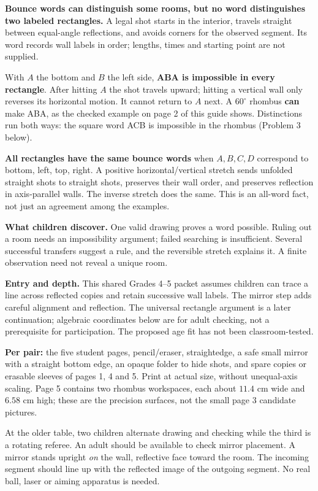 \documentclass[11pt,letterpaper]{article}
\newcommand{\sectiontitle}[1]{\par\vspace{4pt}{\large\bfseries #1}\par}
\begin{document}
\sectiontitle{The mathematics first}
\textbf{Bounce words can distinguish some rooms, but no word distinguishes two labeled rectangles.} A legal shot starts in the interior, travels straight between equal-angle reflections, and avoids corners for the observed segment. Its word records wall labels in order; lengths, times and starting point are not supplied.

With $A$ the bottom and $B$ the left side, \textbf{ABA is impossible in every rectangle}. After hitting $A$ the shot travels upward; hitting a vertical wall only reverses its horizontal motion. It cannot return to $A$ next. A $60^\circ$ rhombus \textbf{can} make ABA, as the checked example on page 2 of this guide shows. Distinctions run both ways: the square word ACB is impossible in the rhombus (Problem 3 below).

\textbf{All rectangles have the same bounce words} when $A,B,C,D$ correspond to bottom, left, top, right. A positive horizontal/vertical stretch sends unfolded straight shots to straight shots, preserves their wall order, and preserves reflection in axis-parallel walls. The inverse stretch does the same. This is an all-word fact, not just an agreement among the examples.

\textbf{What children discover.} One valid drawing proves a word possible. Ruling out a room needs an impossibility argument; failed searching is insufficient. Several successful transfers suggest a rule, and the reversible stretch explains it. A finite observation need not reveal a unique room.

\textbf{Entry and depth.} This shared Grades 4--5 packet assumes children can trace a line across reflected copies and retain successive wall labels. The mirror step adds careful alignment and reflection. The universal rectangle argument is a later continuation; algebraic coordinates below are for adult checking, not a prerequisite for participation. The proposed age fit has not been classroom-tested.

\sectiontitle{Materials and the first visit}
\textbf{Per pair:} the five student pages, pencil/eraser, straightedge, a safe small mirror with a straight bottom edge, an opaque folder to hide shots, and spare copies or erasable sleeves of pages 1, 4 and 5. Print at actual size, without unequal-axis scaling. Page 5 contains two rhombus workspaces, each about $11.4$ cm wide and $6.58$ cm high; these are the precision surfaces, not the small page 3 candidate pictures.

At the older table, two children alternate drawing and checking while the third is a rotating referee. An adult should be available to check mirror placement. A mirror stands upright \emph{on} the wall, reflective face toward the room. The incoming segment should line up with the reflected image of the outgoing segment. No real ball, laser or aiming apparatus is needed.
\end{document}
